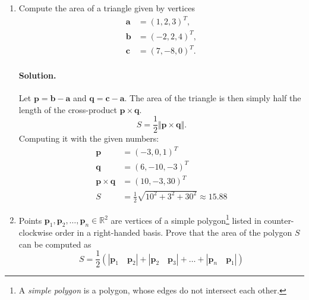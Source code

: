 \documentclass{article}
\newcommand{\bbR}{\mathbb{R}}
\newcommand{\bb}{\mathbf{b}}
\newcommand{\ba}{\mathbf{a}}
\newcommand{\bc}{\mathbf{c}}
\newcommand{\bq}{\mathbf{q}}
\newcommand{\bp}{\mathbf{p}}
\begin{document}
\begin{enumerate}
\item Compute the area of a triangle given by vertices
\begin{align*}
 \ba &= (1, 2, 3)^T, \\
 \bb &= (-2, 2, 4)^T, \\
 \bc &= (7, -8, 0)^T.
\end{align*}

\paragraph{Solution.}
Let $\bp = \bb - \ba$ and $\bq = \bc - \ba$. The area of the triangle is then simply half the length of the cross-product $\bp \times \bq$.
$$
S = \frac{1}{2}\Vert \bp \times \bq\Vert.
$$
Computing it with the given numbers:
\begin{align*}
\bp &= (-3, 0, 1)^T\\
\bq &= (6, -10, -3)^T\\
\bp\times \bq &= (10, -3, 30)^T\\
S &= \frac{1}{2} \sqrt{10^2 + 3^2 + 30^2} \approx 15.88
\end{align*}

\item Points $\bp_1, \bp_2, \dots, \bp_n \in \bbR^2$ are vertices of a simple polygon\footnote{A \emph{simple polygon} is a polygon, whose edges do not intersect each other.} listed in counter-clockwise order in a right-handed basis.
Prove that the area of the polygon $S$ can be computed as
\[
S = \frac{1}{2}(|\bp_1 \quad \bp_2| + |\bp_2 \quad \bp_3| + \dots + |\bp_n \quad \bp_1|)
\]

\end{enumerate}
\end{document}
